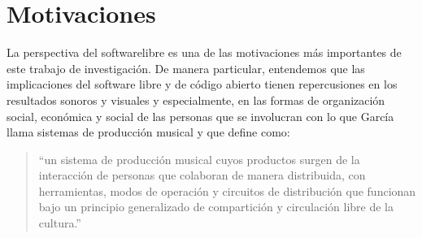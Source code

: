 






\section{Motivaciones}

La perspectiva del \gls{softwarelibre} es una de las motivaciones más importantes de este trabajo de investigación. De manera particular, entendemos que las implicaciones del software libre y de código abierto tienen repercusiones en los resultados sonoros y visuales y especialmente, en las formas de organización social, económica y social de las personas que se involucran con lo que García llama sistemas de producción musical y que define como:

\begin{quote}

  ``un sistema de producción musical cuyos productos surgen de la interacción de personas que colaboran de manera distribuida, con herramientas, modos de operación y circuitos de distribución que funcionan bajo un principio generalizado de compartición y circulación libre de la cultura.''\citep[p.~65]{jorgeDavid2021}

\end{quote}

